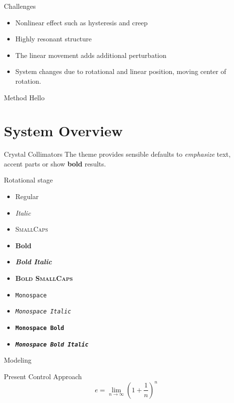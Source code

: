 \documentclass[10pt]{beamer}
\begin{document}
\begin{frame}[fragile]{Challenges}
  \begin{itemize}
    \item Nonlinear effect such as hysteresis and creep
    \item Highly resonant structure
    \item The linear movement adds additional perturbation
    \item System changes due to rotational and linear position, moving center of rotation.
  \end{itemize}
\end{frame}

\begin{frame}[fragile]{Method}
  Hello
\end{frame}

\section{System Overview}

\begin{frame}[fragile]{Crystal Collimators}
  The theme provides sensible defaults to \emph{emphasize} text,
  \alert{accent} parts or show \textbf{bold} results.
\end{frame}

\begin{frame}{Rotational stage}
  \begin{itemize}
    \item Regular
    \item \textit{Italic}
    \item \textsc{SmallCaps}
    \item \textbf{Bold}
    \item \textbf{\textit{Bold Italic}}
    \item \textbf{\textsc{Bold SmallCaps}}
    \item \texttt{Monospace}
    \item \texttt{\textit{Monospace Italic}}
    \item \texttt{\textbf{Monospace Bold}}
    \item \texttt{\textbf{\textit{Monospace Bold Italic}}}
  \end{itemize}
\end{frame}

\begin{frame}{Modeling}
\end{frame}

\begin{frame}{Present Control Approach}
  \begin{equation*}
    e = \lim_{n\to \infty} \left(1 + \frac{1}{n}\right)^n
  \end{equation*}
\end{frame}
\end{document}
